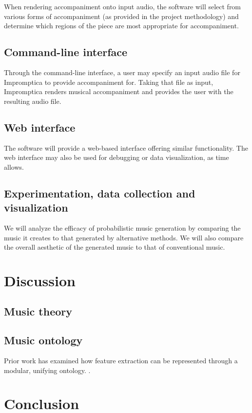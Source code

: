 \documentclass[11pt,conference,letterpaper]{IEEEtran}
\begin{document}
When rendering accompaniment onto input audio, the software will select from various forms of accompaniment (as provided in the project methodology) and determine which regions of the piece are most appropriate for accompaniment.
\subsection{Command-line interface}

Through the command-line interface, a user may specify an input audio file for Impromptica to provide accompaniment for. Taking that file as input, Impromptica renders musical accompaniment and provides the user with the resulting audio file.

\subsection{Web interface}
The software will provide a web-based interface offering similar functionality. The web interface may also be used for debugging or data visualization, as time allows.

\subsection{Experimentation, data collection and visualization}
We will analyze the efficacy of probabilistic music generation by comparing the music it creates to that generated by alternative methods.  We will also compare the overall aesthetic of the generated music to that of conventional music.


\section{Discussion}

\subsection {Music theory}


\subsection{Music ontology}

Prior work has examined how feature extraction can be represented through a modular, unifying ontology. \cite{raimond2008web}.

\section{Conclusion}



\end{document}

